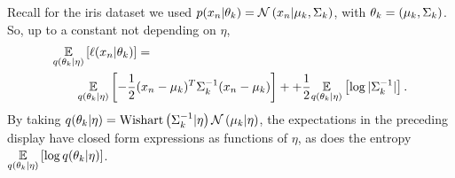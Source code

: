 \begin{ex}
%
Recall for the iris dataset we used $p(x_n \vert \theta_k) = \mathcal{N}\left(x_n \vert
\mu_k, \Sigma_k\right)$, with $\theta_k = (\mu_k, \Sigma_k)$.  So,
up to a constant not depending on $\eta$,
%
\begin{align*}
%
\MoveEqLeft
\expect{\q(\theta_\k \vert \eta)}{\logp(\x_\n \vert \theta_\k)} =\\
&
\expect{\q(\theta_\k \vert \eta)}{
-\frac{1}{2}(\x_n - \mu_k)^T \Sigma_\k^{-1} (\x_n - \mu_k)} +
+\frac{1}{2} \expect{\q(\theta_\k \vert \eta)}{\log |\Sigma_\k^{-1}|}.
%
\end{align*}
%
By taking $q(\theta_k \vert \eta) = \mathrm{Wishart}\left(\Sigma_k^{-1} \vert \eta\right)
\mathcal{N}\left(\mu_k \vert \eta\right)$, the expectations in the preceding display have closed
form expressions as functions of $\eta$, as does the entropy
$\underset{q(\theta_k \vert \eta)}{\mathbb{E}}\left[\log q(\theta_k \vert \eta)\right]$.
%
\end{ex}




